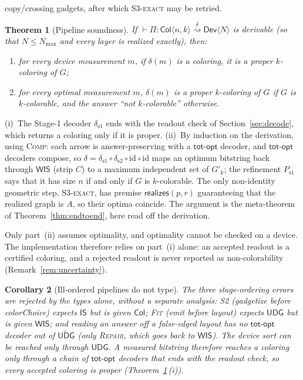 \documentclass[a4paper,fleqn]{cas-sc}
\newtheorem{theorem}{Theorem}[section]
\newtheorem{corollary}[theorem]{Corollary}
\newcommand{\tCol}{\mathsf{Col}}
\newcommand{\tIS}{\mathsf{IS}}
\newcommand{\tWIS}{\mathsf{WIS}}
\newcommand{\tUDG}{\mathsf{UDG}}
\newcommand{\tUDGa}{\widetilde{\mathsf{UDG}}}
\newcommand{\tDev}{\mathsf{Dev}}
\newcommand{\Nmax}{N_{\max}}
\newcommand{\realizes}{\mathsf{realizes}}
\newcommand{\totopt}{\mathsf{tot\text{-}opt}}
\newcommand{\rn}[1]{\textup{\textsc{\footnotesize #1}}}
\newcommand{\redto}[1]{\mathrel{\overset{\textstyle #1}{\rightsquigarrow}}}
\begin{document}
copy/crossing gadgets, after which \rn{S3-exact} may be retried.
\begin{theorem}[Pipeline soundness]
\label{thm:typesound}
If $\vdash \Pi : \tCol\langle n,k\rangle \redto{\delta} \tDev\langle N\rangle$ is
derivable (so that $N\le\Nmax$ and every layer is realized exactly), then:
\begin{enumerate}[label=(\roman*),leftmargin=2.2em]
  \item for every device measurement $m$, if $\delta(m)$ is a coloring, it is a proper
        $k$-coloring of $G$;
  \item for every optimal measurement $m$, $\delta(m)$ is a proper $k$-coloring of $G$
        if $G$ is $k$-colorable, and the answer ``not $k$-colorable'' otherwise.
\end{enumerate}
\end{theorem}
\begin{proofsketch}
(i)~The Stage-1 decoder $\delta_{\mathrm{s1}}$ ends with the readout check of
Section~\ref{sec:decode}, which returns a coloring only if it is proper. (ii)~By
induction on the derivation, using \rn{Comp}: each arrow is answer-preserving with a
$\totopt$ decoder, and $\totopt$ decoders compose, so
$\delta=\delta_{\mathrm{s1}}\!\circ\delta_{\mathrm{s2}}\!\circ\mathrm{id}\circ\mathrm{id}$
maps an optimum bitstring back through $\tWIS$ (strip $C$) to a maximum independent
set of $G'_k$; the refinement $P_{\mathrm{s1}}$ says that it has size $n$ if and only
if $G$ is $k$-colorable. The only
non-identity geometric step, \rn{S3-exact}, has premise $\realizes(p,r)$
guaranteeing that the realized graph is $A$, so their optima coincide. The argument is
the meta-theorem of Theorem~\ref{thm:endtoend}, here read off the derivation.
\end{proofsketch}

\noindent Only part~(ii) assumes optimality, and optimality cannot be checked on a
device. The implementation therefore relies on part~(i) alone: an accepted readout is a
certified coloring, and a rejected readout is never reported as non-colorability
(Remark~\ref{rem:uncertainty}).

\begin{corollary}[Ill-ordered pipelines do not type]
\label{cor:order}
The three stage-ordering errors are rejected by the types alone, without a
separate analysis: \rn{S2} (\emph{gadgetize before colorChoice}) expects $\tIS$ but is
given $\tCol$; \rn{Fit} (\emph{emit before layout}) expects $\tUDG$ but is given
$\tWIS$; and \emph{reading an answer off a false-edged layout} has no $\totopt$
decoder out of $\tUDGa$ (only \rn{Repair}, which goes back to $\tWIS$). The device
sort can be reached only through $\tUDG$. A measured bitstring therefore reaches a
coloring only through a chain of $\totopt$ decoders that ends with the readout check,
so every accepted coloring is proper (Theorem~\ref{thm:typesound}\,(i)).
\end{corollary}
\end{document}
